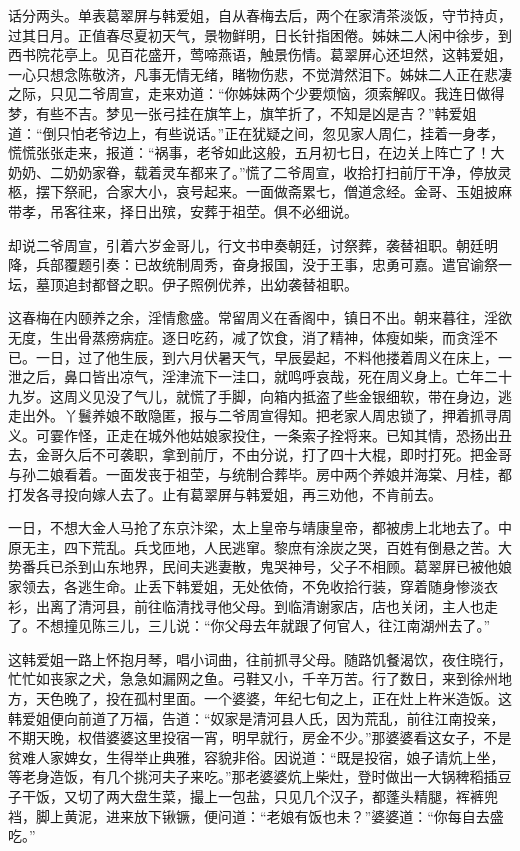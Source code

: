 话分两头。单表葛翠屏与韩爱姐，自从春梅去后，两个在家清茶淡饭，守节持贞，过其日月。正值春尽夏初天气，景物鲜明，日长针指困倦。姊妹二人闲中徐步，到西书院花亭上。见百花盛开，莺啼燕语，触景伤情。葛翠屏心还坦然，这韩爱姐，一心只想念陈敬济，凡事无情无绪，睹物伤悲，不觉潸然泪下。姊妹二人正在悲凄之际，只见二爷周宣，走来劝道：“你姊妹两个少要烦恼，须索解叹。我连日做得梦，有些不吉。梦见一张弓挂在旗竿上，旗竿折了，不知是凶是吉？”韩爱姐道：“倒只怕老爷边上，有些说话。”正在犹疑之间，忽见家人周仁，挂着一身孝，慌慌张张走来，报道：“祸事，老爷如此这般，五月初七日，在边关上阵亡了！大奶奶、二奶奶家眷，载着灵车都来了。”慌了二爷周宣，收拾打扫前厅干净，停放灵柩，摆下祭祀，合家大小，哀号起来。一面做斋累七，僧道念经。金哥、玉姐披麻带孝，吊客往来，择日出殡，安葬于祖茔。俱不必细说。

却说二爷周宣，引着六岁金哥儿，行文书申奏朝廷，讨祭葬，袭替祖职。朝廷明降，兵部覆题引奏：已故统制周秀，奋身报国，没于王事，忠勇可嘉。遣官谕祭一坛，墓顶追封都督之职。伊子照例优养，出幼袭替祖职。

这春梅在内颐养之余，淫情愈盛。常留周义在香阁中，镇日不出。朝来暮往，淫欲无度，生出骨蒸痨病症。逐日吃药，减了饮食，消了精神，体瘦如柴，而贪淫不已。一日，过了他生辰，到六月伏暑天气，早辰晏起，不料他搂着周义在床上，一泄之后，鼻口皆出凉气，淫津流下一洼口，就鸣呼哀哉，死在周义身上。亡年二十九岁。这周义见没了气儿，就慌了手脚，向箱内抵盗了些金银细软，带在身边，逃走出外。丫鬟养娘不敢隐匿，报与二爷周宣得知。把老家人周忠锁了，押着抓寻周义。可霎作怪，正走在城外他姑娘家投住，一条索子拴将来。已知其情，恐扬出丑去，金哥久后不可袭职，拿到前厅，不由分说，打了四十大棍，即时打死。把金哥与孙二娘看着。一面发丧于祖茔，与统制合葬毕。房中两个养娘并海棠、月桂，都打发各寻投向嫁人去了。止有葛翠屏与韩爱姐，再三劝他，不肯前去。

一日，不想大金人马抢了东京汴梁，太上皇帝与靖康皇帝，都被虏上北地去了。中原无主，四下荒乱。兵戈匝地，人民逃窜。黎庶有涂炭之哭，百姓有倒悬之苦。大势番兵已杀到山东地界，民间夫逃妻散，鬼哭神号，父子不相顾。葛翠屏已被他娘家领去，各逃生命。止丢下韩爱姐，无处依倚，不免收拾行装，穿着随身惨淡衣衫，出离了清河县，前往临清找寻他父母。到临清谢家店，店也关闭，主人也走了。不想撞见陈三儿，三儿说：“你父母去年就跟了何官人，往江南湖州去了。”

这韩爱姐一路上怀抱月琴，唱小词曲，往前抓寻父母。随路饥餐渴饮，夜住晓行，忙忙如丧家之犬，急急如漏网之鱼。弓鞋又小，千辛万苦。行了数日，来到徐州地方，天色晚了，投在孤村里面。一个婆婆，年纪七旬之上，正在灶上杵米造饭。这韩爱姐便向前道了万福，告道：“奴家是清河县人氏，因为荒乱，前往江南投亲，不期天晚，权借婆婆这里投宿一宵，明早就行，房金不少。”那婆婆看这女子，不是贫难人家婢女，生得举止典雅，容貌非俗。因说道：“既是投宿，娘子请炕上坐，等老身造饭，有几个挑河夫子来吃。”那老婆婆炕上柴灶，登时做出一大锅稗稻插豆子干饭，又切了两大盘生菜，撮上一包盐，只见几个汉子，都蓬头精腿，裈裤兜裆，脚上黄泥，进来放下锹镢，便问道：“老娘有饭也未？”婆婆道：“你每自去盛吃。”

